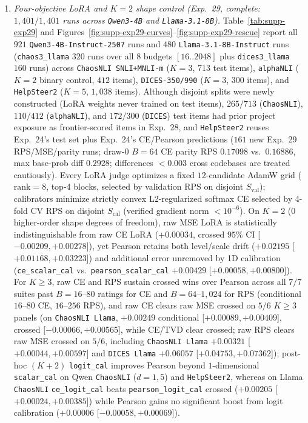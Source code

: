 \begin{enumerate}
    \item \emph{Four-objective LoRA and $K=2$ shape control (Exp.~29, complete: $1{,}401/1{,}401$ runs across \texttt{Qwen3-4B} and \texttt{Llama-3.1-8B}).} Table~\ref{tab:supp-exp29} and Figures~\ref{fig:supp-exp29-curves}--\ref{fig:supp-exp29-rescue} report all $921$ \texttt{Qwen3-4B-Instruct-2507} runs and $480$ \texttt{Llama-3.1-8B-Instruct} runs (\texttt{chaos3\_llama} $320$ runs over all $8$ budgets $[16..2048]$ plus \texttt{dices3\_llama} $160$ runs) across \texttt{ChaosNLI SNLI+MNLI-m} ($K=3$, $713$ test items), \texttt{alphaNLI} ($K=2$ binary control, $412$ items), \texttt{DICES-350/990} ($K=3$, $300$ items), and \texttt{HelpSteer2} ($K=5$, $1{,}038$ items). Although disjoint splits were newly constructed (LoRA weights never trained on test items), $265/713$ (\texttt{ChaosNLI}), $110/412$ (\texttt{alphaNLI}), and $172/300$ (\texttt{DICES}) test items had prior project exposure as frontier-scored items in Exp.~28, and \texttt{HelpSteer2} reuses Exp.~24's test set plus Exp.~24's CE/Pearson predictions ($161$ new Exp.~29 RPS/MSE/parity runs; draw-0 $B=64$ CE parity RPS $0.17098$ vs.\ $0.16886$, max base-prob diff $0.2928$; differences $<0.003$ cross codebases are treated cautiously). Every LoRA judge optimizes a fixed $12$-candidate AdamW grid ($\text{rank}=8$, top-$4$ blocks, selected by validation RPS on disjoint $S_{\text{val}}$); calibrators minimize strictly convex L2-regularized softmax CE selected by 4-fold CV RPS on disjoint $S_{\text{cal}}$ (verified gradient norm $<10^{-6}$). On $K=2$ ($0$ higher-order shape degrees of freedom), raw MSE LoRA is statistically indistinguishable from raw CE LoRA ($+0.00034$, crossed $95\%$ CI [$-0.00209,+0.00278$]), yet Pearson retains both level/scale drift ($+0.02195$ [$+0.01168,+0.03223$]) and additional error unremoved by 1D calibration (\texttt{ce\_scalar\_cal} vs.\ \texttt{pearson\_scalar\_cal} $+0.00429$ [$+0.00058,+0.00800$]). For $K\ge 3$, raw CE and RPS sustain crossed wins over Pearson across all $7/7$ suites past $B=16$--$80$ ratings for CE and $B=64$--$1{,}024$ for RPS (conditional $16$--$80$ CE, $16$--$256$ RPS), and raw CE clears raw MSE crossed on $5/6$ $K\ge 3$ panels (on \texttt{ChaosNLI Llama}, $+0.00249$ conditional [$+0.00089,+0.00409$], crossed [$-0.00066,+0.00565$], while CE/TVD clear crossed; raw RPS clears raw MSE crossed on $5/6$, including \texttt{ChaosNLI Llama} $+0.00321$ [$+0.00044,+0.00597$] and \texttt{DICES Llama} $+0.06057$ [$+0.04753,+0.07362$]); post-hoc $(K+2)$ \texttt{logit\_cal} improves Pearson beyond $1$-dimensional \texttt{scalar\_cal} on Qwen \texttt{ChaosNLI} ($d=1,5$) and \texttt{HelpSteer2}, whereas on Llama \texttt{ChaosNLI} \texttt{ce\_logit\_cal} beats \texttt{pearson\_logit\_cal} crossed ($+0.00205$ [$+0.00024,+0.00385$]) while Pearson gains no significant boost from logit calibration ($+0.00006$ [$-0.00058,+0.00069$]).
\end{enumerate}

